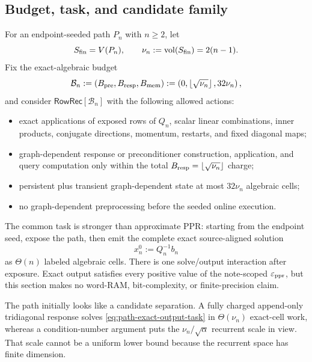 \subsection{Budget, task, and candidate family}

For an endpoint-seeded path $P_n$ with $n\geq2$, let
\[
 S_{\rm fin}=V(P_n),
 \qquad
 \nu_n:=\operatorname{vol}(S_{\rm fin})=2(n-1).
\]
Fix the exact-algebraic budget
\begin{equation}
 \mathcal B_n:=
 (B_{\rm pre},B_{\rm resp},B_{\rm mem})
 :=
 \left(0,\left\lfloor\sqrt{\nu_n}\right\rfloor,32\nu_n\right),
 \label{eq:concrete-rowrec-budget}
\end{equation}
and consider
$\mathsf{RowRec}[\mathcal B_n]$ with the following allowed actions:

\begin{itemize}
\item exact applications of exposed rows of $Q_n$, scalar linear
      combinations, inner products, conjugate directions, momentum, restarts,
      and fixed diagonal maps;
\item graph-dependent response or preconditioner construction, application,
      and query computation only within the total
      $B_{\rm resp}=\lfloor\sqrt{\nu_n}\rfloor$ charge;
\item persistent plus transient graph-dependent state at most $32\nu_n$
      algebraic cells;
\item no graph-dependent preprocessing before the seeded online execution.
\end{itemize}

The common task is stronger than approximate PPR: starting from the endpoint
seed, expose the path, then emit the complete exact source-aligned solution
\begin{equation}
 x_n^0:=Q_n^{-1}b_n
 \label{eq:path-exact-output-task}
\end{equation}
as $\Theta(n)$ labeled algebraic cells.  There is one solve/output interaction after
exposure.  Exact output satisfies every positive value of the note-scoped
$\varepsilon_{\mathrm{ppr}}$, but this section makes no word-RAM, bit-complexity, or
finite-precision claim.

The path initially looks like a candidate separation.  A fully charged
append-only tridiagonal response solves
\cref{eq:path-exact-output-task} in $\Theta(\nu_n)$ exact-cell work, whereas a
condition-number argument puts the
$\nu_n/\sqrt\alpha$ recurrent scale in view.  That scale cannot be a uniform
lower bound because the recurrent space has finite dimension.

